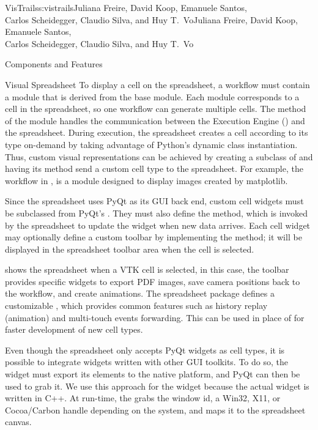 \begin{aosachaptertoc}{VisTrails}{s:vistrails}{Juliana Freire, David Koop, Emanuele Santos, \\ Carlos Scheidegger, Claudio Silva, and Huy T.\ Vo}{Juliana Freire, David Koop, Emanuele Santos, \\ \hspace*{0.9cm} Carlos Scheidegger, Claudio Silva, and Huy T.\ Vo}
\begin{aosasect1}{Components and Features}
\begin{aosasect2}{Visual Spreadsheet}
To display a cell on the spreadsheet, a workflow must contain a module
that is derived from the base  module.  Each
 module corresponds to a cell in the
spreadsheet, so one workflow can generate multiple cells.  The
 method of the  module handles the
communication between the Execution Engine
() and the spreadsheet.  During
execution, the spreadsheet creates a cell according to its type
on-demand by taking advantage of Python's dynamic class instantiation.
Thus, custom visual representations can be achieved by creating a
subclass of  and having its 
method send a custom cell type to the spreadsheet. For example, the
workflow in , 
is a  module designed to display images created
by matplotlib.

Since the spreadsheet uses PyQt as its GUI back end, custom cell
widgets must be subclassed from PyQt's .  They must also
define the  method, which is invoked by the
spreadsheet to update the widget when new data arrives. Each cell
widget may optionally define a custom toolbar by implementing the
 method; it will be displayed in the spreadsheet
toolbar area when the cell is selected.

 shows the spreadsheet when a
VTK cell is selected, in this case, the toolbar provides specific
widgets to export PDF images, save camera positions back to the
workflow, and create animations.  The spreadsheet package defines a
customizable , which provides common features such
as history replay (animation) and multi-touch events forwarding. This
can be used in place of  for faster development of new
cell types.

Even though the spreadsheet only accepts PyQt widgets as cell types,
it is possible to integrate widgets written with other GUI toolkits.
To do so, the widget must export its elements to the native platform,
and PyQt can then be used to grab it. We use this approach for the
 widget because the actual widget is written in C++. At
run-time, the  grabs the window id, a Win32, X11, or
Cocoa/Carbon handle depending on the system, and maps it to the
spreadsheet canvas.


\end{aosasect2}
\end{aosasect1}
\end{aosachaptertoc}
